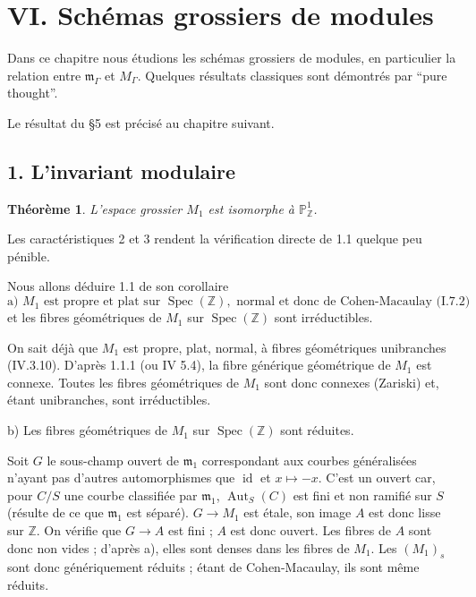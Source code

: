 \documentclass[10pt,a4paper]{amsart}
\theoremstyle{plain}
\newtheorem{theorem}{Th\'eor\`eme}[section]
\theoremstyle{definition}
\DeclareMathOperator{\Spec}{Spec}
\DeclareMathOperator{\Aut}{Aut}
\newcommand{\m}{\mathfrak{m}}
\newcommand{\ZZ}{\mathbb{Z}}
\DeclareMathOperator{\id}{id}
\begin{document}
\section*{VI. Sch\'emas grossiers de modules}

\setcounter{theorem}{0}
\setcounter{section}{5}
\setcounter{subsection}{0}

Dans ce chapitre nous \'etudions les sch\'emas grossiers de modules, en particulier la relation entre $\m_\Gamma$ et $M_\Gamma$. Quelques r\'esultats classiques sont d\'emontr\'es par ``pure thought''.

Le r\'esultat du \S 5 est pr\'ecis\'e au chapitre suivant.

\subsection*{1. L'invariant modulaire}

\setcounter{theorem}{0}
\begin{theorem}
L'espace grossier $M_1$ est isomorphe \`a $\mathbb{P}^1_\ZZ$.
\end{theorem}

Les caract\'eristiques 2 et 3 rendent la v\'erification directe de 1.1 quelque peu p\'enible.

Nous allons d\'eduire 1.1 de son corollaire
\begin{equation}
\text{a) } M_1 \text{ est propre et plat sur } \Spec(\ZZ), \text{ normal et donc de Cohen-Macaulay (I.7.2)}
\end{equation}
et les fibres g\'eom\'etriques de $M_1$ sur $\Spec(\ZZ)$ sont irr\'eductibles.

On sait d\'ej\`a que $M_1$ est propre, plat, normal, \`a fibres g\'eom\'etriques unibranches (IV.3.10). D'apr\`es 1.1.1 (ou IV 5.4), la fibre g\'en\'erique g\'eom\'etrique de $M_1$ est connexe. Toutes les fibres g\'eom\'etriques de $M_1$ sont donc connexes (Zariski) et, \'etant unibranches, sont irr\'eductibles.

b) Les fibres g\'eom\'etriques de $M_1$ sur $\Spec(\ZZ)$ sont r\'eduites.

Soit $G$ le sous-champ ouvert de $\m_1$ correspondant aux courbes g\'en\'eralis\'ees n'ayant pas d'autres automorphismes que $\id$ et $x \mapsto -x$. C'est un ouvert car, pour $C/S$ une courbe classifi\'ee par $\m_1$, $\Aut_S(C)$ est fini et non ramifi\'e sur $S$ (r\'esulte de ce que $\m_1$ est s\'epar\'e). $G \to M_1$ est \'etale, son image $A$ est donc lisse sur $\ZZ$. On v\'erifie que $G \to A$ est fini ; $A$ est donc ouvert. Les fibres de $A$ sont donc non vides ; d'apr\`es a), elles sont denses dans les fibres de $M_1$. Les $(M_1)_s$ sont donc g\'en\'eriquement r\'eduits ; \'etant de Cohen-Macaulay, ils sont m\^eme r\'eduits.
\end{document}
